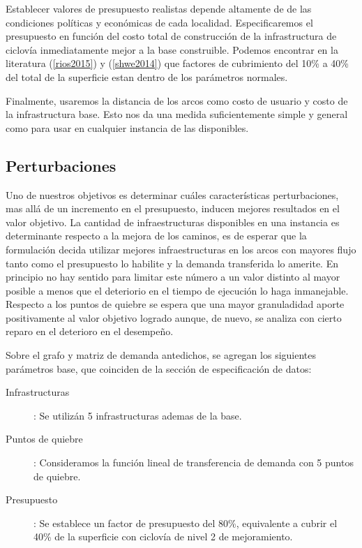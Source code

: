 \documentclass{article}
\begin{document}
  Establecer valores de presupuesto realistas depende altamente de de las condiciones políticas y económicas de cada localidad. Especificaremos el presupuesto en función del costo total de construcción de la infrastructura de ciclovía inmediatamente mejor a la base construible. Podemos encontrar en la literatura (\ref{rios2015}) y (\ref{shwe2014}) que factores de cubrimiento del 10\% a 40\% del total de la superficie estan dentro de los parámetros normales.

  Finalmente, usaremos la distancia de los arcos como costo de usuario y costo de la infrastructura base. Esto nos da una medida suficientemente simple y general como para usar en cualquier instancia de las disponibles.

  \subsection{Perturbaciones}

  Uno de nuestros objetivos es determinar cuáles características perturbaciones, mas allá de un incremento en el presupuesto, inducen mejores resultados en el valor objetivo. La cantidad de infraestructuras disponibles en una instancia es determinante respecto a la mejora de los caminos, es de esperar que la formulación decida utilizar mejores infraestructuras en los arcos con mayores flujo tanto como el presupuesto lo habilite y la demanda transferida lo amerite. En principio no hay sentido para limitar este número a un valor distinto al mayor posible a menos que el deteriorio en el tiempo de ejecución lo haga inmanejable. Respecto a los puntos de quiebre se espera que una mayor granuladidad aporte positivamente al valor objetivo logrado aunque, de nuevo, se analiza con cierto reparo en el deterioro en el desempeño.

  Sobre el grafo y matriz de demanda antedichos, se agregan los siguientes parámetros base, que coinciden de la sección de especificación de datos:

  \begin{description}
    \item[Infrastructuras]: Se utilizán 5 infrastructuras ademas de la base.
    \item[Puntos de quiebre]: Consideramos la función lineal de transferencia de demanda con 5 puntos de quiebre.
    \item[Presupuesto]: Se establece un factor de presupuesto del 80\%, equivalente a cubrir el 40\% de la superficie con ciclovía de nivel 2 de mejoramiento.
  \end{description}
\end{document}
